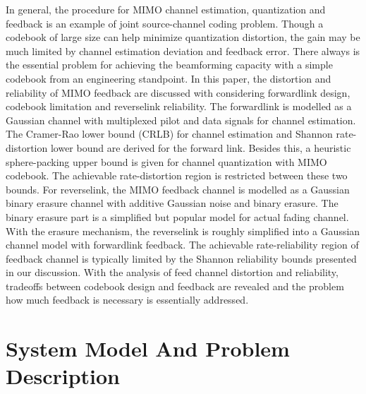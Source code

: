 \documentclass[10pt,fleqn, twocolumn]{IEEEtran}
\begin{document}
In general, the procedure for MIMO channel estimation,
quantization and feedback is an example of joint source-channel
coding problem. Though a codebook of large size can help minimize
quantization distortion, the gain may be much limited by channel
estimation deviation and feedback error. There always is the
essential problem for achieving the beamforming capacity with a
simple codebook from an engineering standpoint. In this paper, the
distortion and reliability of MIMO feedback are discussed with
considering forwardlink design, codebook limitation and
reverselink reliability. The forwardlink is modelled as a Gaussian
channel with multiplexed pilot and data signals for channel
estimation. The Cramer-Rao lower bound (CRLB) for channel
estimation and Shannon rate-distortion lower bound are derived for
the forward link. Besides this, a heuristic sphere-packing upper
bound is given for channel quantization with MIMO codebook. The
achievable rate-distortion region is restricted between these two
bounds. For reverselink, the MIMO feedback channel is modelled as
a Gaussian binary erasure channel with additive Gaussian noise and
binary erasure. The binary erasure part is a simplified but
popular model for actual fading channel. With the erasure
mechanism, the reverselink is roughly simplified into a Gaussian
channel model with forwardlink feedback. The achievable
rate-reliability region of feedback channel is typically limited
by the Shannon reliability bounds presented in our discussion.
With the analysis of feed channel distortion and reliability,
tradeoffs between codebook design and feedback are revealed and
the problem how much feedback is necessary is essentially
addressed.

\section{System Model And Problem Description\label{MIMO_system_model}}
\end{document}
